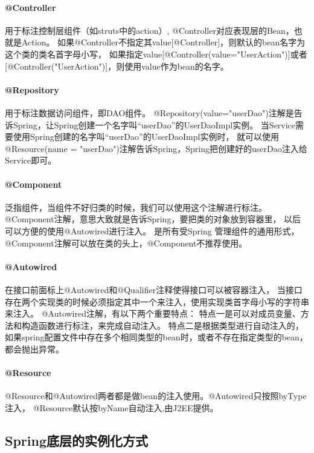 \documentclass{book}
\begin{document}
\paragraph{@Controller}用于标注控制层组件（如struts中的action）,
@Controller对应表现层的Bean，也就是Action。
如果@Controller不指定其value[@Controller]，则默认的bean名字为这个类的类名首字母小写，
如果指定value[@Controller(value="UserAction")]或者[@Controller("UserAction")]，则使用value作为bean的名字。

\paragraph{@Repository}用于标注数据访问组件，即DAO组件。
@Repository(value="userDao")注解是告诉Spring，让Spring创建一个名字叫“userDao”的UserDaoImpl实例。
当Service需要使用Spring创建的名字叫“userDao”的UserDaoImpl实例时，
就可以使用@Resource(name = "userDao")注解告诉Spring，Spring把创建好的userDao注入给Service即可。

\paragraph{@Component}泛指组件，当组件不好归类的时候，我们可以使用这个注解进行标注。
@Component注解，意思大致就是告诉Spring，要把类的对象放到容器里，
以后可以方便的使用@Autowired进行注入。
是所有受Spring 管理组件的通用形式，@Component注解可以放在类的头上，@Component不推荐使用。

\paragraph{@Autowired}在接口前面标上@Autowired和@Qualifier注释使得接口可以被容器注入，
当接口存在两个实现类的时候必须指定其中一个来注入，使用实现类首字母小写的字符串来注入。
@Autowired注解，有以下两个重要特点：
特点一是可以对成员变量、方法和构造函数进行标注，来完成自动注入。
特点二是根据类型进行自动注入的，如果spring配置文件中存在多个相同类型的bean时，或者不存在指定类型的bean，都会抛出异常。

\paragraph{@Resource}@Resource和@Autowired两者都是做bean的注入使用。@Autowired只按照byType注入，
@Resource默认按byName自动注入,由J2EE提供。

\subsection{Spring底层的实例化方式}
\end{document}
